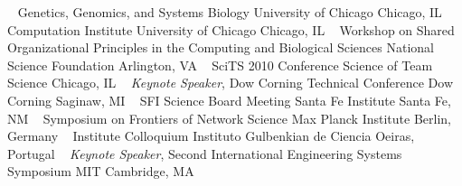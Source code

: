 ~
\Gap
{}
Genetics, Genomics, and Systems Biology
\newline
    University of Chicago
    \newline
Chicago, IL
\newline
~
\Gap
{}
Computation Institute
\newline
    University of Chicago
    \newline
Chicago, IL
\newline
~
\Gap
{}
Workshop on Shared Organizational Principles in the Computing and Biological Sciences
\newline
    National Science Foundation
    \newline
Arlington, VA
\newline
~
\Gap
{}
SciTS 2010 Conference
\newline
    Science of Team Science
    \newline
Chicago, IL
\newline
~
\Gap
{}
\textit{Keynote Speaker}, Dow Corning Technical Conference
\newline
    Dow Corning
    \newline
Saginaw, MI
\newline
~
\Gap
{}
SFI Science Board Meeting
\newline
    Santa Fe Institute
    \newline
Santa Fe, NM
\newline
~
\Gap
{}
Symposium on Frontiers of Network Science
\newline
    Max Planck Institute
    \newline
Berlin, Germany
\newline
~
\Gap
{}
Institute Colloquium
\newline
    Instituto Gulbenkian de Ciencia
    \newline
Oeiras, Portugal
\newline
~
\Gap
{}
\textit{Keynote Speaker}, Second International Engineering Systems Symposium
\newline
    MIT
    \newline
Cambridge, MA
\newline
~
\Gap
{}
